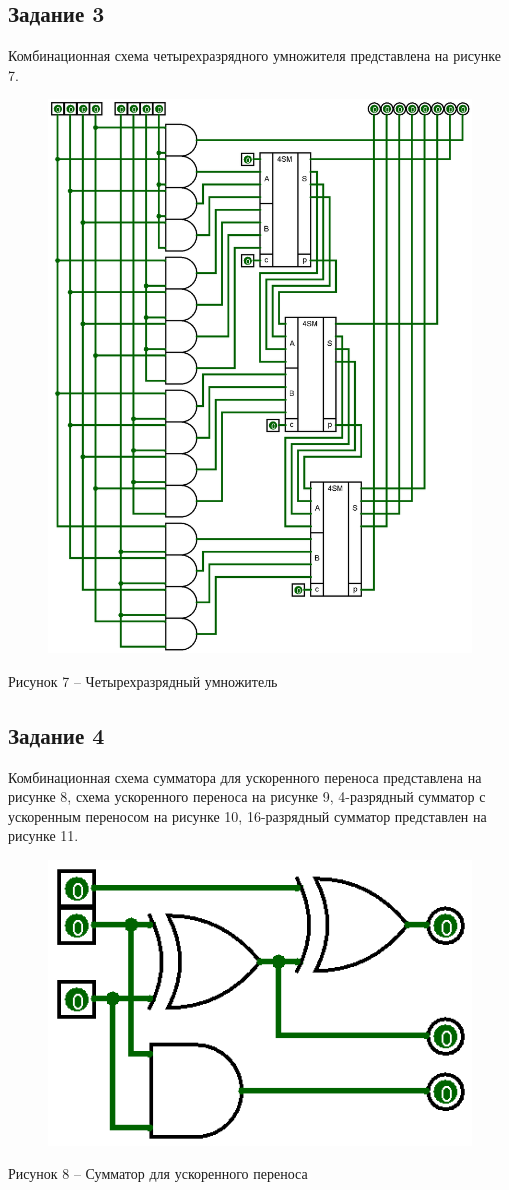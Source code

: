 \documentclass[a4paper,14pt]{extarticle}
\begin{document}
  \pagebreak
  \subsection*{Задание 3}
  Комбинационная схема четырехразрядного умножителя представлена на рисунке 7.
  \begin{figure}[h]
    \centering
    \includegraphics[width=0.9\linewidth]{images/s-3}
  \end{figure}
  \begin{center}
    Рисунок 7 – Четырехразрядный умножитель
  \end{center}
  
  \pagebreak
  \subsection*{Задание 4}
  Комбинационная схема сумматора для ускоренного переноса представлена на рисунке 8, схема ускоренного переноса на рисунке 9, 4-разрядный сумматор с ускоренным переносом на рисунке 10, 16-разрядный сумматор представлен на рисунке 11.
  
  \begin{figure}[h]
    \centering
    \includegraphics[width=0.35\linewidth]{images/s-4-1}
  \end{figure}
  \begin{center}
    Рисунок 8 – Сумматор для ускоренного переноса
  \end{center}
  
\end{document}
